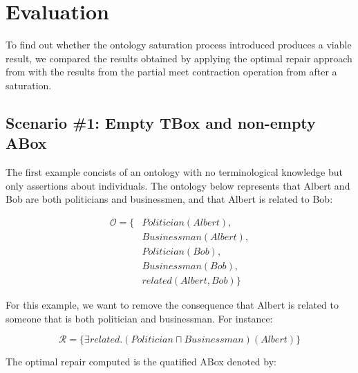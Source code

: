 
\chapter{Evaluation}
\label{chap:evaluation}

To find out whether the ontology saturation process introduced produces a viable result, we compared the results obtained by applying the optimal repair approach from \citep{Baader-CADE2021} with the results from the partial meet contraction operation from \citep{Matos2021} after a saturation.

\section{Scenario \#1: Empty TBox and non-empty ABox}
\label{sec:scenario-1}

The first example concists of an ontology with no terminological knowledge but only assertions about individuals. The ontology below represents that Albert and  Bob are both politicians and businessmen, and that Albert is related to Bob:

\begin{equation*}
    \begin{aligned}
        \mathcal{O} = \{ & Politician(Albert),  \\
                         & Businessman(Albert), \\
                         & Politician(Bob),     \\
                         & Businessman(Bob),    \\
                         & related(Albert, Bob) \}
    \end{aligned}
\end{equation*}

For this example, we want to remove the consequence that Albert is related to someone that is both politician and businessman. For instance:

$$\mathcal{R} = \{\exists related.(Politician \sqcap Businessman)(Albert) \}$$

The optimal repair computed is the quatified ABox denoted by:

